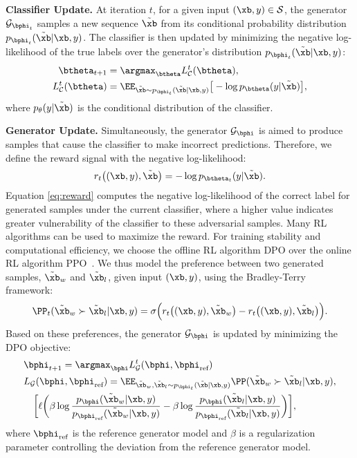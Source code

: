 \textbf{Classifier Update.} 
At iteration $t$, for a given input $(\xb,y) \in \mathcal{S}$, the generator $\mathcal{G}_{\bphi_t}$ samples a new sequence $\tilde\xb$ from its conditional probability distribution $p_{\bphi_t}(\tilde{\xb} | \xb, y)$.
The classifier is then updated by minimizing the negative log-likelihood of the true labels over the generator’s distribution $p_{\bphi_t}(\tilde{\xb} | \xb,y)$:
\begin{align}
    \btheta_{t+1} & = \argmax_{\btheta} L_{\mathcal{C}}^t(\btheta), \nonumber\\
    L_{\mathcal{C}}^t(\btheta) & =  \EE_{\tilde\xb\sim p_{\bphi_t}(\tilde\xb|\xb,y)} \big[-\log p_{\btheta}(y|\tilde\xb)\big], \label{eq:update_classifier}
\end{align}
where $p_\theta (y|\tilde\xb)$ is the conditional distribution of the classifier. 

\textbf{Generator Update.}
Simultaneously, the generator $\mathcal{G}_{\bphi}$ is aimed to produce samples that cause the classifier to make incorrect predictions. 
Therefore, we define the reward signal with the negative log-likelihood: \vspace{-2mm}
\begin{align}\label{eq:reward}
r_t\big((\xb,y), \tilde\xb \big) = - \log p_{\btheta_t} (y | \tilde\xb).
\end{align}
Equation \eqref{eq:reward} computes the negative log-likelihood of the correct label for generated samples under the current classifier, where a higher value indicates greater vulnerability of the classifier to these adversarial samples. 
Many RL algorithms can be used to maximize the reward. For training stability and computational efficiency, we choose the offline RL algorithm DPO over the online RL algorithm PPO~\citep{schulman2017proximal}. We thus model the preference between two generated samples, $\tilde\xb_w$ and $\tilde\xb_l$, given input $(\xb,y)$, using the Bradley-Terry framework:\vspace{-0.1mm}
\begin{align*} 
\PP_t(\tilde \xb_w \succ \tilde\xb_l | \xb,y) = \sigma\Big(r_t\big((\xb,y), \tilde\xb_w\big) - r_t\big((\xb,y), \tilde\xb_l\big)\Big).
\end{align*}
Based on these preferences, the generator $\mathcal{G}_{\bphi}$ is updated by minimizing the DPO objective:
\begin{align}
& \bphi_{t+1} = \argmax_{\bphi} L^t_{\mathcal{G}}(\bphi, \bphi_{\text{ref}})\nonumber\\
    &L_{\mathcal{G}}(\bphi, \bphi_{\text{ref}}) = \EE_{\tilde \xb_w, \tilde\xb_l \sim p_{\bphi_t}(\tilde \xb|\xb,y)} \PP(\tilde \xb_w \succ \tilde\xb_l | \xb,y), \nonumber \\
    &\quad \bigg[\ell\bigg(\beta \log \frac{p_{\bphi}(\tilde{\xb}_w | \xb, y)}{p_{\bphi_{\text{ref}}}(\tilde{\xb}_w | \xb, y)} - \beta \log \frac{p_{\bphi}(\tilde{\xb}_l | \xb, y)}{p_{\bphi_{\text{ref}}}(\tilde{\xb}_l | \xb, y)}\bigg)\bigg],\label{eq:population_dpo}
\end{align}
where $\bphi_{\text{ref}}$ is the reference generator model and $\beta$ is a regularization parameter controlling the deviation from the reference generator model. 

